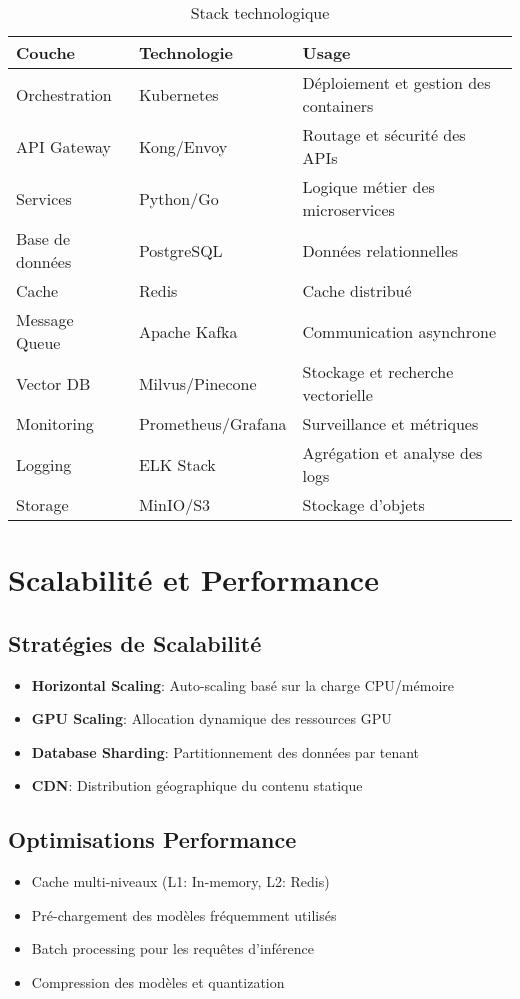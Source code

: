 \documentclass[12pt,a4paper]{article}
\begin{document}
\begin{table}[H]
\centering
\begin{tabular}{|l|l|l|}
\hline
\textbf{Couche} & \textbf{Technologie} & \textbf{Usage} \\
\hline
Orchestration & Kubernetes & Déploiement et gestion des containers \\
\hline
API Gateway & Kong/Envoy & Routage et sécurité des APIs \\
\hline
Services & Python/Go & Logique métier des microservices \\
\hline
Base de données & PostgreSQL & Données relationnelles \\
\hline
Cache & Redis & Cache distribué \\
\hline
Message Queue & Apache Kafka & Communication asynchrone \\
\hline
Vector DB & Milvus/Pinecone & Stockage et recherche vectorielle \\
\hline
Monitoring & Prometheus/Grafana & Surveillance et métriques \\
\hline
Logging & ELK Stack & Agrégation et analyse des logs \\
\hline
Storage & MinIO/S3 & Stockage d'objets \\
\hline
\end{tabular}
\caption{Stack technologique}
\end{table}

\section{Scalabilité et Performance}

\subsection{Stratégies de Scalabilité}
\begin{itemize}
    \item \textbf{Horizontal Scaling}: Auto-scaling basé sur la charge CPU/mémoire
    \item \textbf{GPU Scaling}: Allocation dynamique des ressources GPU
    \item \textbf{Database Sharding}: Partitionnement des données par tenant
    \item \textbf{CDN}: Distribution géographique du contenu statique
\end{itemize}

\subsection{Optimisations Performance}
\begin{itemize}
    \item Cache multi-niveaux (L1: In-memory, L2: Redis)
    \item Pré-chargement des modèles fréquemment utilisés
    \item Batch processing pour les requêtes d'inférence
    \item Compression des modèles et quantization
\end{itemize}
\end{document}
